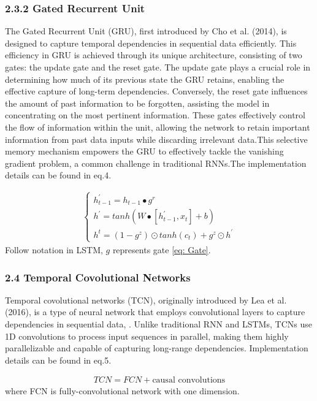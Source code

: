 \documentclass[10pt,letterpaper]{article}
\begin{document}
\subsubsection*{2.3.2 Gated Recurrent Unit}
 The Gated Recurrent Unit (GRU), first introduced by Cho et al. (2014), is designed to capture temporal dependencies in sequential data efficiently. This efficiency in GRU is achieved through its unique architecture, consisting of two gates: the update gate and the reset gate. The update gate plays a crucial role in determining how much of its previous state the GRU retains, enabling the effective capture of long-term dependencies. Conversely, the reset gate influences the amount of past information to be forgotten, assisting the model in concentrating on the most pertinent information. These gates effectively control the flow of information within the unit, allowing the network to retain important information from past data inputs while discarding irrelevant data.This selective memory mechanism empowers the GRU to effectively tackle the vanishing gradient problem, a common challenge in traditional RNNs.The implementation details can be found in eq.4.

\begin{eqnarray}
\label{eq: GRU}
    \begin {cases} h^{'}_{t - 1} = h_{t - 1}{\bullet}g^r
    \\h^{'} = tanh(W\bullet[h^{'}_{t - 1}, x_t] + b)
    \\h^t = (1 - g^z){\odot}tanh(c_t) + g^z{\odot}h^{'}
    \end {cases}
\end{eqnarray}
Follow notation in LSTM,  $g$ represents gate \ref{eq: Gate}.



\subsubsection*{2.4 Temporal Covolutional Networks}
Temporal covolutional networks (TCN), originally introduced by Lea et al. (2016), is a type of neural network that employs convolutional layers to capture dependencies in sequential data, . Unlike traditional RNN and LSTMs, TCNs use 1D convolutions to process input sequences in parallel, making them highly parallelizable and capable of capturing long-range dependencies. Implementation details can be found in eq.5.

\begin{eqnarray}
\label{eq: TCN}
    TCN = FCN + \text{causal convolutions}
\end{eqnarray}
where FCN is fully-convolutional network with one dimension.
\end{document}
